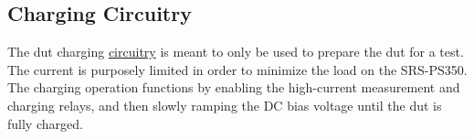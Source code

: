 \subsection{Charging Circuitry}
\label{sec:charging}

The \gls{dut} charging \hyperlink{sch:discharging}{circuitry} is meant to only be used to prepare the \gls{dut} for a test. The current is purposely limited in order to minimize the load on the SRS-PS350. The charging operation functions by enabling the high-current measurement and charging relays, and then slowly ramping the DC bias voltage until the \gls{dut} is fully charged.

